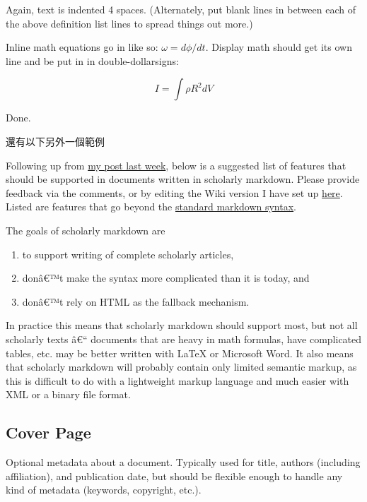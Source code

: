 \documentclass[]{article}
\newcommand{\euro}{€}
\begin{document}
Again, text is indented 4 spaces. (Alternately, put blank lines in
between each of the above definition list lines to spread things out
more.)

Inline math equations go in like so: $\omega = d\phi / dt$. Display math
should get its own line and be put in in double-dollarsigns:

\[I = \int \rho R^{2} dV\]

Done.

還有以下另外一個範例

Following up from \href{/2012/12/13/a-call-for-scholarly-markdown/}{my
post last week}, below is a suggested list of features that should be
supported in documents written in scholarly markdown. Please provide
feedback via the comments, or by editing the Wiki version I have set up
\href{https://github.com/mfenner/scholarly-markdown/wiki}{here}. Listed
are features that go beyond the
\href{http://daringfireball.net/projects/markdown/syntax}{standard
markdown syntax}.

The goals of scholarly markdown are

\begin{enumerate}
\def\labelenumi{\arabic{enumi}.}
\itemsep1pt\parskip0pt
\item
  to support writing of complete scholarly articles,
\item
  donâ\euro{}™t make the syntax more complicated than it is today, and
\item
  donâ\euro{}™t rely on HTML as the fallback mechanism.
\end{enumerate}

In practice this means that scholarly markdown should support most, but
not all scholarly texts â\euro{}`` documents that are heavy in math
formulas, have complicated tables, etc. may be better written with LaTeX
or Microsoft Word. It also means that scholarly markdown will probably
contain only limited semantic markup, as this is difficult to do with a
lightweight markup language and much easier with XML or a binary file
format.

\subsection{Cover Page}\label{cover-page}

Optional metadata about a document. Typically used for title, authors
(including affiliation), and publication date, but should be flexible
enough to handle any kind of metadata (keywords, copyright, etc.).
\end{document}
